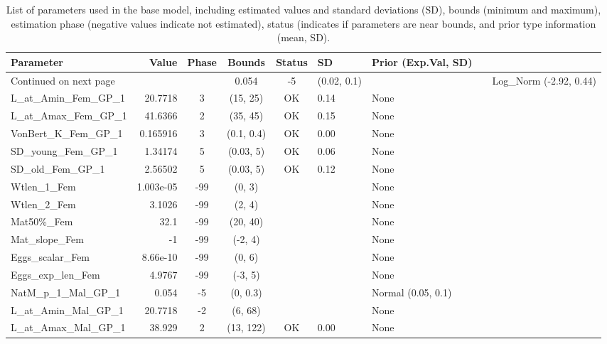 \documentclass[12pt,]{article}
\begin{document}
\begin{landscape}
\begin{longtable}{lrcccll}
\caption{List of parameters used in
                                          the base model, including estimated 
                                          values and standard deviations (SD), 
                                          bounds (minimum and maximum), 
                                          estimation phase (negative values indicate
                                          not estimated), status (indicates if 
                                          parameters are near bounds, and prior type
                                          information (mean, SD).} \\ 
  \hline
Parameter & Value & Phase & Bounds & Status & SD & Prior (Exp.Val, SD)  \\ 
  \hline 
\endhead 
\hline 
\multicolumn{3}{l}{\footnotesize Continued on next page} 
\endfoot 
\endlastfoot 
 \hline
NatM\_p\_1\_Fem\_GP\_1 & 0.054 & -5 & (0.02, 0.1) &  &  & Log\_Norm (-2.92, 0.44) \\ 
  L\_at\_Amin\_Fem\_GP\_1 & 20.7718 & 3 & (15, 25) & OK & 0.14 & None \\ 
  L\_at\_Amax\_Fem\_GP\_1 & 41.6366 & 2 & (35, 45) & OK & 0.15 & None \\ 
  VonBert\_K\_Fem\_GP\_1 & 0.165916 & 3 & (0.1, 0.4) & OK & 0.00 & None \\ 
  SD\_young\_Fem\_GP\_1 & 1.34174 & 5 & (0.03, 5) & OK & 0.06 & None \\ 
  SD\_old\_Fem\_GP\_1 & 2.56502 & 5 & (0.03, 5) & OK & 0.12 & None \\ 
  Wtlen\_1\_Fem & 1.003e-05 & -99 & (0, 3) &  &  & None \\ 
  Wtlen\_2\_Fem & 3.1026 & -99 & (2, 4) &  &  & None \\ 
  Mat50\%\_Fem & 32.1 & -99 & (20, 40) &  &  & None \\ 
  Mat\_slope\_Fem & -1 & -99 & (-2, 4) &  &  & None \\ 
  Eggs\_scalar\_Fem & 8.66e-10 & -99 & (0, 6) &  &  & None \\ 
  Eggs\_exp\_len\_Fem & 4.9767 & -99 & (-3, 5) &  &  & None \\ 
  NatM\_p\_1\_Mal\_GP\_1 & 0.054 & -5 & (0, 0.3) &  &  & Normal (0.05, 0.1) \\ 
  L\_at\_Amin\_Mal\_GP\_1 & 20.7718 & -2 & (6, 68) &  &  & None \\ 
  L\_at\_Amax\_Mal\_GP\_1 & 38.929 & 2 & (13, 122) & OK & 0.00 & None \\ 

\end{longtable}
\end{landscape}
\end{document}
